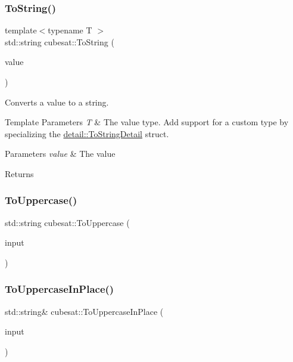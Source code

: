 \subsubsection{\texorpdfstring{To\+String()}{ToString()}}
{\footnotesize\ttfamily template$<$typename T $>$ \\
std\+::string cubesat\+::\+To\+String (\begin{DoxyParamCaption}\item[{T}]{value }\end{DoxyParamCaption})\hspace{0.3cm}{\ttfamily [inline]}}



Converts a value to a string. 


\begin{DoxyTemplParams}{Template Parameters}
{\em T} & The value type. Add support for a custom type by specializing the \hyperlink{structcubesat_1_1detail_1_1ToStringDetail}{detail\+::\+To\+String\+Detail} struct. \\
\hline
\end{DoxyTemplParams}

\begin{DoxyParams}{Parameters}
{\em value} & The value \\
\hline
\end{DoxyParams}
\begin{DoxyReturn}{Returns}

\end{DoxyReturn}
\mbox{\label{namespacecubesat_aae60436b7b01010bc7ae7fb4a26492d4}} 
\subsubsection{\texorpdfstring{To\+Uppercase()}{ToUppercase()}}
{\footnotesize\ttfamily std\+::string cubesat\+::\+To\+Uppercase (\begin{DoxyParamCaption}\item[{std\+::string}]{input }\end{DoxyParamCaption})\hspace{0.3cm}{\ttfamily [inline]}}

\mbox{\label{namespacecubesat_a752f5fe0a540f983cb1c67110ec6ff62}} 
\subsubsection{\texorpdfstring{To\+Uppercase\+In\+Place()}{ToUppercaseInPlace()}}
{\footnotesize\ttfamily std\+::string\& cubesat\+::\+To\+Uppercase\+In\+Place (\begin{DoxyParamCaption}\item[{std\+::string \&}]{input }\end{DoxyParamCaption})\hspace{0.3cm}{\ttfamily [inline]}}

